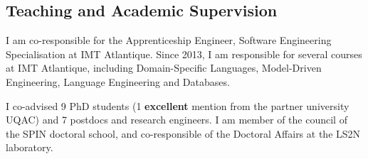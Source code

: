 \subsection*{Teaching and Academic Supervision}

I am co-responsible for the Apprenticeship Engineer, Software Engineering Specialisation at IMT Atlantique. Since 2013, I am responsible for several courses at IMT Atlantique, including Domain-Specific Languages, Model-Driven Engineering, Language Engineering and Databases.

I co-advised 9 PhD students (1 \textbf{excellent} mention from the partner university UQAC) and 7 postdocs and research engineers. I am member of the council of the SPIN doctoral school, and co-responsible of the Doctoral Affairs at the LS2N laboratory.
